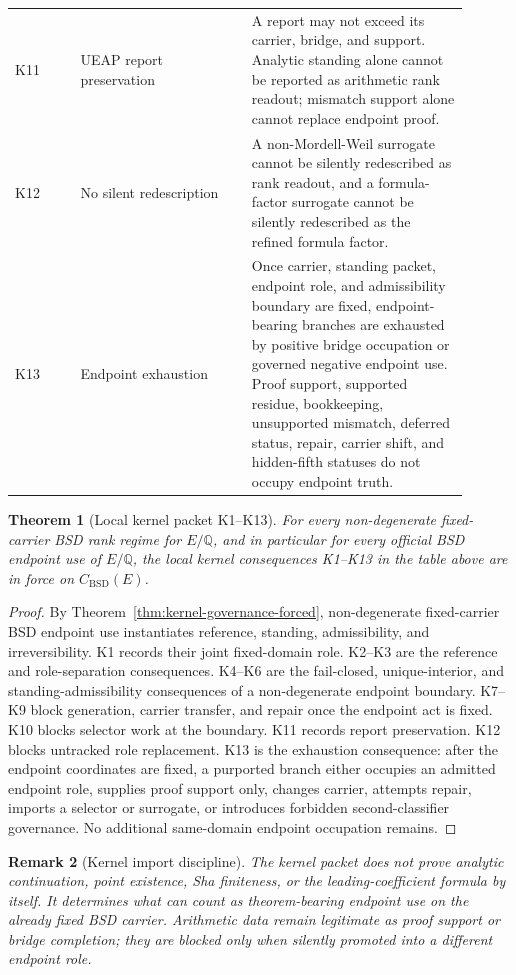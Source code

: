 \documentclass[11pt]{article}
\newtheorem{theorem}{Theorem}[section]
\newtheorem{remark}[theorem]{Remark}
\newcommand{\Q}{\mathbb{Q}}
\newcommand{\BSD}{\mathrm{BSD}}
\begin{document}
\begin{longtable}{L{0.13\linewidth}L{0.34\linewidth}L{0.43\linewidth}}
K11 & UEAP report preservation & A report may not exceed its carrier, bridge, and support. Analytic standing alone cannot be reported as arithmetic rank readout; mismatch support alone cannot replace endpoint proof.\\
K12 & No silent redescription & A non-Mordell-Weil surrogate cannot be silently redescribed as rank readout, and a formula-factor surrogate cannot be silently redescribed as the refined formula factor.\\
K13 & Endpoint exhaustion & Once carrier, standing packet, endpoint role, and admissibility boundary are fixed, endpoint-bearing branches are exhausted by positive bridge occupation or governed negative endpoint use. Proof support, supported residue, bookkeeping, unsupported mismatch, deferred status, repair, carrier shift, and hidden-fifth statuses do not occupy endpoint truth.\\
\bottomrule
\end{longtable}

\begin{theorem}[Local kernel packet K1--K13]\label{thm:local-kernel-packet}
For every non-degenerate fixed-carrier BSD rank regime for $E/\Q$, and in particular for every official BSD endpoint use of $E/\Q$, the local kernel consequences K1--K13 in the table above are in force on $C_{\BSD}(E)$.
\end{theorem}

\begin{proof}
By Theorem~\ref{thm:kernel-governance-forced}, non-degenerate fixed-carrier BSD endpoint use instantiates reference, standing, admissibility, and irreversibility. K1 records their joint fixed-domain role. K2--K3 are the reference and role-separation consequences. K4--K6 are the fail-closed, unique-interior, and standing-admissibility consequences of a non-degenerate endpoint boundary. K7--K9 block generation, carrier transfer, and repair once the endpoint act is fixed. K10 blocks selector work at the boundary. K11 records report preservation. K12 blocks untracked role replacement. K13 is the exhaustion consequence: after the endpoint coordinates are fixed, a purported branch either occupies an admitted endpoint role, supplies proof support only, changes carrier, attempts repair, imports a selector or surrogate, or introduces forbidden second-classifier governance. No additional same-domain endpoint occupation remains.
\end{proof}

\begin{remark}[Kernel import discipline]
The kernel packet does not prove analytic continuation, point existence, Sha finiteness, or the leading-coefficient formula by itself. It determines what can count as theorem-bearing endpoint use on the already fixed BSD carrier. Arithmetic data remain legitimate as proof support or bridge completion; they are blocked only when silently promoted into a different endpoint role.
\end{remark}
\end{document}
